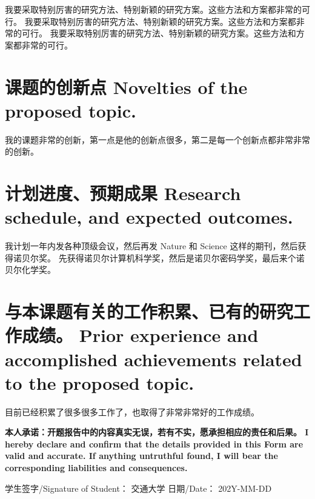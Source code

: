 \documentclass[a4paper,zihao=-4,AutoFakeBold]{ctexart}
\begin{document}
我要采取特别厉害的研究方法、特别新颖的研究方案。这些方法和方案都非常的可行。
我要采取特别厉害的研究方法、特别新颖的研究方案。这些方法和方案都非常的可行。
我要采取特别厉害的研究方法、特别新颖的研究方案。这些方法和方案都非常的可行。



\section{课题的创新点 Novelties of the proposed topic.}

我的课题非常的创新，第一点是他的创新点很多，第二是每一个创新点都非常非常的创新。



\section{计划进度、预期成果 Research schedule, and expected outcomes.}

我计划一年内发各种顶级会议，然后再发 Nature 和 Science 这样的期刊，然后获得诺贝尔奖。
先获得诺贝尔计算机科学奖，然后是诺贝尔密码学奖，最后来个诺贝尔化学奖。



\section{与本课题有关的工作积累、已有的研究工作成绩。
    Prior experience and accomplished achievements 
    related to the proposed topic.}


目前已经积累了很多很多工作了，也取得了非常非常好的工作成绩。




\vspace{\baselineskip}

\bfseries\fangsong
\noindent
本人承诺：开题报告中的内容真实无误，若有不实，愿承担相应的责任和后果。
I hereby declare and confirm that the details 
provided in this Form are valid and accurate. 
If anything untruthful found, 
I will bear the corresponding liabilities and consequences.

\vspace{\baselineskip}

\noindent
学生签字/Signature of Student： 交通大学
\hfill              
日期/Date： 202Y-MM-DD
\end{document}
